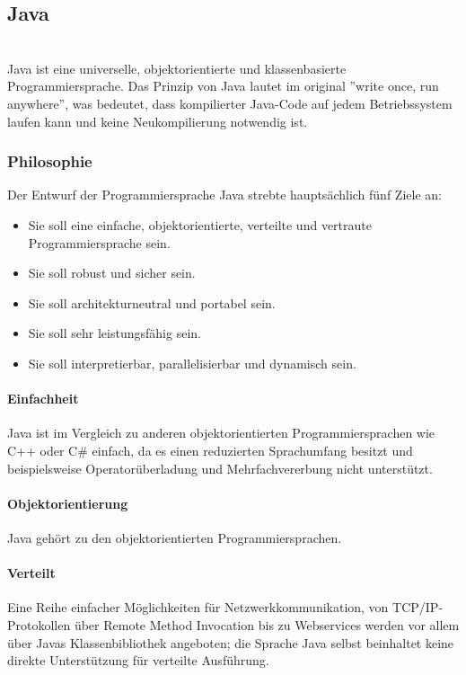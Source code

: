 \subsection{Java}\ \\
Java ist eine universelle, objektorientierte und klassenbasierte Programmiersprache. Das Prinzip von Java lautet im original ''write once, run anywhere'', was bedeutet, dass kompilierter Java-Code auf jedem Betriebssystem laufen kann und keine Neukompilierung notwendig ist.
\subsubsection{Philosophie}
Der Entwurf der Programmiersprache Java strebte hauptsächlich fünf Ziele an:

\begin{itemize}
	\item Sie soll eine einfache, objektorientierte, verteilte und vertraute Programmiersprache sein.
	\item Sie soll robust und sicher sein.
	\item Sie soll architekturneutral und portabel sein.
	\item Sie soll sehr leistungsfähig sein.
	\item Sie soll interpretierbar, parallelisierbar und dynamisch sein.
\end{itemize}
\noindent


\setcounter{secnumdepth}{4}
\paragraph{Einfachheit}
Java ist im Vergleich zu anderen objektorientierten Programmiersprachen wie C++ oder C\# einfach, da es einen reduzierten Sprachumfang besitzt und beispielsweise Operatorüberladung und Mehrfachvererbung nicht unterstützt.

\paragraph{Objektorientierung}
Java gehört zu den objektorientierten Programmiersprachen.

\paragraph{Verteilt}
Eine Reihe einfacher Möglichkeiten für Netzwerkkommunikation, von TCP/IP-Protokollen über Remote Method Invocation bis zu Webservices werden vor allem über Javas Klassenbibliothek angeboten; die Sprache Java selbst beinhaltet keine direkte Unterstützung für verteilte Ausführung.

